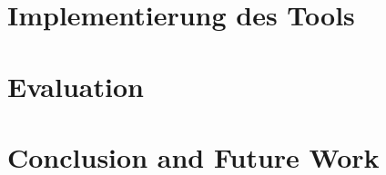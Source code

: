 \documentclass[a4paper,12pt,oneside, bibliography=totoc]
{scrbook}
\begin{document}
\chapter{Implementierung des Tools}

\clearpage

\chapter{Evaluation}
	\label{sec:evaluation}
	

\chapter{Conclusion and Future Work}
\label{sec:conclusion}



\printbibliography

\clearpage 





\end{document}
